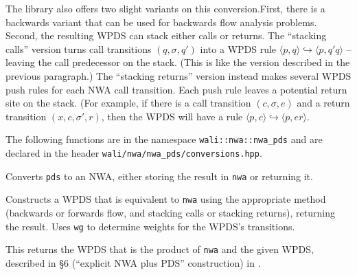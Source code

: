 The library also offers two slight variants on this conversion.First, there
is a backwards variant that can be used for backwards flow analysis
problems. Second, the resulting WPDS can stack either calls or returns. The
``stacking calls'' version turns call transitions $(q, \sigma, q')$ into a
WPDS rule $\langle p, q\rangle \hookrightarrow \langle p, q' q\rangle$ --
leaving the call predecessor on the stack. (This is like the version
described in the previous paragraph.) The ``stacking returns'' version
instead makes several WPDS push rules for each NWA call transition. Each
push rule leaves a potential return site on the stack. (For example, if there
is a call transition $(c,\sigma,e)$ and a return transition $(x, c, \sigma',
r)$, then the WPDS will have a rule $\langle p,
c\rangle\hookrightarrow\langle p, e r\rangle$.


The following functions are in the namespace \texttt{wali::nwa::nwa\_pds} and
are declared in the header \texttt{wali/nwa/nwa\_pds/conversions.hpp}.


\begin{functionlist}
   \nopagebreak
   \nopagebreak
    Converts \texttt{pds} to an NWA, either storing the result in
    \texttt{nwa} or returning it.

   \nopagebreak
   \nopagebreak
   \nopagebreak
   \nopagebreak
    Constructs a WPDS that is equivalent to \texttt{nwa} using the
    appropriate method (backwards or forwards flow, and stacking calls or
    stacking returns), returning the result. Uses \texttt{wg} to determine
    weights for the WPDS's transitions.

   \nopagebreak

    This returns the WPDS that is the
    product of \texttt{nwa} and the given WPDS, described in \S6 (``explicit
    NWA plus PDS'' construction) in
    \cite{advancedquerying}.
\end{functionlist}


